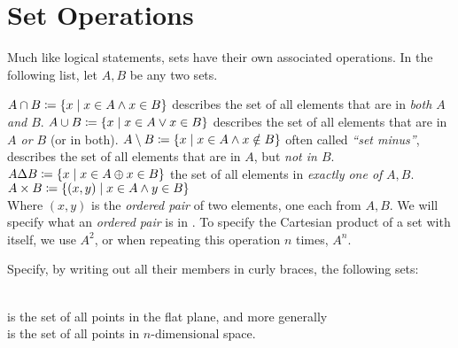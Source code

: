 \section{Set Operations}
Much like logical statements, sets have their own associated operations.
In the following list, let \(A, B\) be any two sets.
\begin{itemize}
        \(A \cap B \coloneq \{x \mid x \in A \land x \in B\}\) describes the set of all
        elements that are in \emph{both \(A\) and \(B\)}.
        \(A \cup B \coloneq \{x \mid x \in A \lor x \in B\}\) describes the set of all
        elements that are in \emph{\(A\) or \(B\)} (or in both).
        \(A \setminus B \coloneq \{x \mid x \in A \land x \notin B\}\) often called \emph{``set
        minus''}, describes the set of all elements that are in \(A\), but
        \emph{not in \(B\)}.
        \(A \Delta B \coloneq \{x \mid x \in A \oplus x \in B\}\) the set of all elements in
        \emph{exactly one of} \(A, B\).
        \(A \times B \coloneq \{(x, y) \mid x \in A \land y \in B\}\)\\
        Where \((x,y)\) is the \emph{ordered pair} of two elements, one each from \(A, B\).
        We will specify what an \emph{ordered pair} is in .
        To specify the Cartesian product of a set with itself, we use \(A^{2}\), or when
        repeating this operation \(n\) times, \(A^{n}\).
\end{itemize}

\begin{exercise}
  Specify, by writing out all their members in curly braces, the following sets:
  \begin{itemize}
  \end{itemize}
\end{exercise}

\begin{example}
  \begin{itemize}
    \leavevmode
    \ii{\(\RR \cap \ZZ = \ZZ\)}
      \\is the set of all points in the flat plane, and more generally
      \\is the set of all points in \(n\text{-dimensional}\) space.
\end{itemize}
\end{example}

